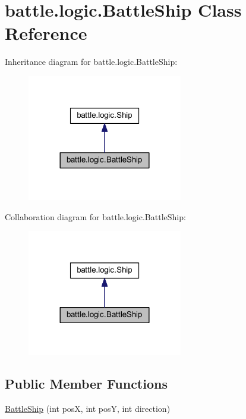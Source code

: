 \hypertarget{classbattle_1_1logic_1_1_battle_ship}{}\section{battle.\+logic.\+Battle\+Ship Class Reference}
\label{classbattle_1_1logic_1_1_battle_ship}


Inheritance diagram for battle.\+logic.\+Battle\+Ship\+:
\nopagebreak
\begin{figure}[H]
\begin{center}
\leavevmode
\includegraphics[width=192pt]{classbattle_1_1logic_1_1_battle_ship__inherit__graph}
\end{center}
\end{figure}


Collaboration diagram for battle.\+logic.\+Battle\+Ship\+:
\nopagebreak
\begin{figure}[H]
\begin{center}
\leavevmode
\includegraphics[width=192pt]{classbattle_1_1logic_1_1_battle_ship__coll__graph}
\end{center}
\end{figure}
\subsection*{Public Member Functions}
\begin{DoxyCompactItemize}
\item 
\hyperlink{classbattle_1_1logic_1_1_battle_ship_a9c99d3c5a8260f49ad032318026dc361}{Battle\+Ship} (int pos\+X, int pos\+Y, int direction)
\end{DoxyCompactItemize}


